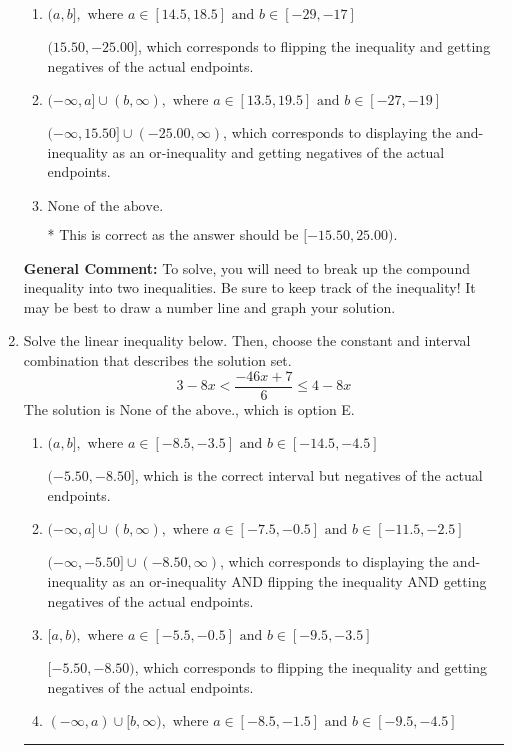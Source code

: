 \documentclass{extbook}[14pt]
\newcommand{\litem}[1]{\item #1

\rule{\textwidth}{0.4pt}}
\begin{document}
\begin{enumerate}
{\begin{enumerate}[label=\Alph*.]
$[15.50, -25.00)$, which is the correct interval but negatives of the actual endpoints.
\item \( (a, b], \text{ where } a \in [14.5, 18.5] \text{ and } b \in [-29, -17] \)

$(15.50, -25.00]$, which corresponds to flipping the inequality and getting negatives of the actual endpoints.
\item \( (-\infty, a] \cup (b, \infty), \text{ where } a \in [13.5, 19.5] \text{ and } b \in [-27, -19] \)

$(-\infty, 15.50] \cup (-25.00, \infty)$, which corresponds to displaying the and-inequality as an or-inequality and getting negatives of the actual endpoints.
\item \( \text{None of the above.} \)

* This is correct as the answer should be $[-15.50, 25.00)$.
\end{enumerate}

\textbf{General Comment:} To solve, you will need to break up the compound inequality into two inequalities. Be sure to keep track of the inequality! It may be best to draw a number line and graph your solution.
}
\litem{
Solve the linear inequality below. Then, choose the constant and interval combination that describes the solution set.
\[ 3 - 8 x < \frac{-46 x + 7}{6} \leq 4 - 8 x \]The solution is \( \text{None of the above.} \), which is option E.\begin{enumerate}[label=\Alph*.]
\item \( (a, b], \text{ where } a \in [-8.5, -3.5] \text{ and } b \in [-14.5, -4.5] \)

$(-5.50, -8.50]$, which is the correct interval but negatives of the actual endpoints.
\item \( (-\infty, a] \cup (b, \infty), \text{ where } a \in [-7.5, -0.5] \text{ and } b \in [-11.5, -2.5] \)

$(-\infty, -5.50] \cup (-8.50, \infty)$, which corresponds to displaying the and-inequality as an or-inequality AND flipping the inequality AND getting negatives of the actual endpoints.
\item \( [a, b), \text{ where } a \in [-5.5, -0.5] \text{ and } b \in [-9.5, -3.5] \)

$[-5.50, -8.50)$, which corresponds to flipping the inequality and getting negatives of the actual endpoints.
\item \( (-\infty, a) \cup [b, \infty), \text{ where } a \in [-8.5, -1.5] \text{ and } b \in [-9.5, -4.5] \)


\end{enumerate}}
\end{enumerate}
\end{document}
